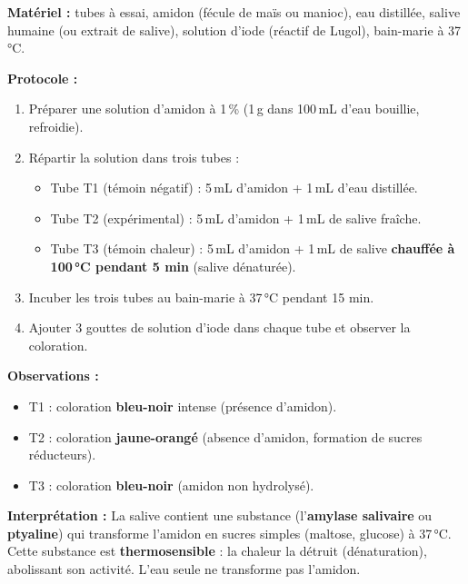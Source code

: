 \documentclass[11pt]{article}
\begin{document}
\begin{experience}
\textbf{Matériel :} tubes à essai, amidon (fécule de maïs ou manioc), eau distillée, salive humaine (ou extrait de salive), solution d'iode (réactif de Lugol), bain-marie à 37\,°C.

\textbf{Protocole :}
\begin{enumerate}
\item Préparer une solution d'amidon à 1\,\% (1\,g dans 100\,mL d'eau bouillie, refroidie).
\item Répartir la solution dans trois tubes :
\begin{itemize}
\item Tube T1 (témoin négatif) : 5\,mL d'amidon + 1\,mL d'eau distillée.
\item Tube T2 (expérimental) : 5\,mL d'amidon + 1\,mL de salive fraîche.
\item Tube T3 (témoin chaleur) : 5\,mL d'amidon + 1\,mL de salive \textbf{chauffée à 100\,°C pendant 5 min} (salive dénaturée).
\end{itemize}
\item Incuber les trois tubes au bain-marie à 37\,°C pendant 15 min.
\item Ajouter 3 gouttes de solution d'iode dans chaque tube et observer la coloration.
\end{enumerate}

\textbf{Observations :}
\begin{itemize}
\item T1 : coloration \textbf{bleu-noir} intense (présence d'amidon).
\item T2 : coloration \textbf{jaune-orangé} (absence d'amidon, formation de sucres réducteurs).
\item T3 : coloration \textbf{bleu-noir} (amidon non hydrolysé).
\end{itemize}

\textbf{Interprétation :} La salive contient une substance (l'\textbf{amylase salivaire} ou \textbf{ptyaline}) qui transforme l'amidon en sucres simples (maltose, glucose) à 37\,°C. Cette substance est \textbf{thermosensible} : la chaleur la détruit (dénaturation), abolissant son activité. L'eau seule ne transforme pas l'amidon.
\end{experience}
\end{document}
